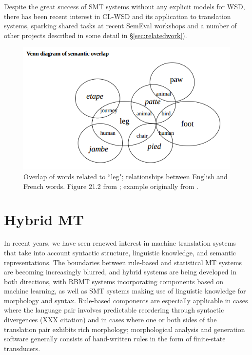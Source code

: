 Despite the great success of SMT systems without any explicit models for WSD,
there has been recent interest in CL-WSD and its application to translation
systems, sparking shared tasks at recent SemEval workshops
\cite{lefever-hoste:2010:SemEval,task10} and a number of other projects
described in some detail in \S\ref{sec:relatedwork}).

\begin{figure}
  \includegraphics[width=12cm]{hutchins-leg-etc.png}
  \caption{Overlap of words related to ``leg"; relationships between English
  and French words. Figure 21.2 from \protect\cite{slp1}; example originally
  from \protect\cite[Chapter 6]{hutchins1992introduction}.}
  \label{fig:leg}
\end{figure}


\section{Hybrid MT}
In recent years, we have seen renewed interest in machine translation systems
that take into account syntactic structure, linguistic knowledge, and semantic
representations.
The boundaries between rule-based and statistical MT systems are becoming
increasingly blurred, and hybrid systems are being developed in both
directions, with RBMT systems incorporating components based on machine
learning, as well as SMT systems making use of linguistic knowledge for
morphology and syntax.
Rule-based components are especially applicable in cases where the language
pair involves predictable reordering through syntactic divergences
(XXX citation)
and in cases where one or both sides of the translation pair exhibits rich
morphology; morphological analysis and generation software generally consists
of hand-written rules in the form of finite-state transducers.

